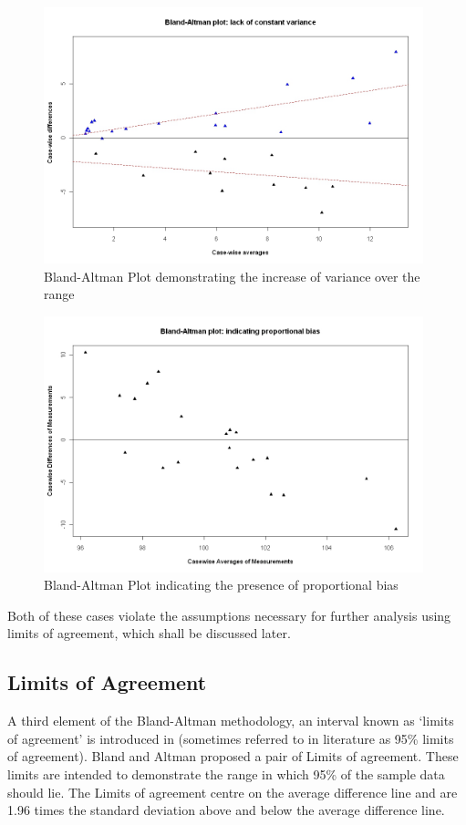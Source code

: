 \documentclass[12pt, a4paper]{report}
\theoremstyle{plain}
\theoremstyle{definition}
\theoremstyle{remark}
\begin{document}
	\begin{figure}[h!]
		\begin{center}
			\includegraphics[width=110mm]{images/BAFanEffect.jpeg}
			\caption{Bland-Altman Plot demonstrating the increase of variance over the range}\label{BAFanEffect}
		\end{center}
	\end{figure}
	
	\begin{figure}[h!]
		\begin{center}
			\includegraphics[width=110mm]{images/PropBias.jpeg}
			\caption{Bland-Altman Plot indicating the presence of proportional bias}\label{PropBias}
		\end{center}
	\end{figure}
Both of these cases violate the assumptions necessary for further analysis using limits of agreement, which shall be discussed later. 

\subsection{Limits of Agreement}
A third element of the Bland-Altman methodology, an interval known
as `limits of agreement' is introduced in \citet*{BA86}
(sometimes referred to in literature as 95\% limits of agreement). Bland and Altman proposed a pair of Limits of agreement. These
limits are intended to demonstrate the range in which 95\% of the
sample data should lie. The Limits of agreement centre on the
average difference line and are 1.96 times the standard deviation
above and below the average difference line.
\end{document}

